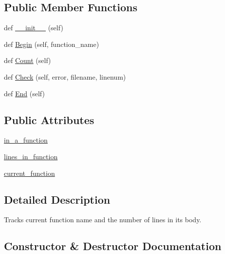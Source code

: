 \subsection*{Public Member Functions}
\begin{DoxyCompactItemize}
\item 
def \hyperlink{classcpplint_1_1__FunctionState_a3f6a865710852cc74c6a7085180458ae}{\+\_\+\+\_\+init\+\_\+\+\_\+} (self)
\item 
def \hyperlink{classcpplint_1_1__FunctionState_a41215c4d73baccbb340f6d0df1c1f4b3}{Begin} (self, function\+\_\+name)
\item 
def \hyperlink{classcpplint_1_1__FunctionState_ac25c9711911ae181b091b52619cf2701}{Count} (self)
\item 
def \hyperlink{classcpplint_1_1__FunctionState_a5e4ad7d7b104038b45204ab4abf527b2}{Check} (self, error, filename, linenum)
\item 
def \hyperlink{classcpplint_1_1__FunctionState_a1ab6b0a575c25c135f9004b7fb12dc4a}{End} (self)
\end{DoxyCompactItemize}
\subsection*{Public Attributes}
\begin{DoxyCompactItemize}
\item 
\hyperlink{classcpplint_1_1__FunctionState_a8362d472591f60462184bf68b49c0efb}{in\+\_\+a\+\_\+function}
\item 
\hyperlink{classcpplint_1_1__FunctionState_a886f5d476adc81f499a711750a399aa2}{lines\+\_\+in\+\_\+function}
\item 
\hyperlink{classcpplint_1_1__FunctionState_a320674f54bd75087febc8f0d83620569}{current\+\_\+function}
\end{DoxyCompactItemize}


\subsection{Detailed Description}
\begin{DoxyVerb}Tracks current function name and the number of lines in its body.\end{DoxyVerb}
 

\subsection{Constructor \& Destructor Documentation}
